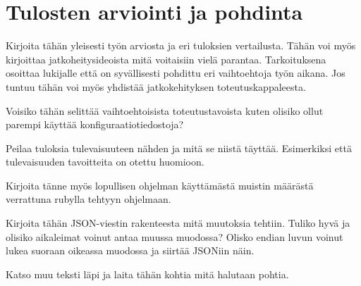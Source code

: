 \chapter{Tulosten arviointi ja pohdinta}
\begin{it}
Kirjoita tähän yleisesti työn arviosta ja eri tuloksien vertailusta. Tähän voi myös kirjoittaa jatkoheitysideoista mitä voitaisiin vielä parantaa. Tarkoituksena osoittaa lukijalle että on syvällisesti pohdittu eri vaihtoehtoja työn aikana. Jos tuntuu tähän voi myös yhdistää jatkokehityksen toteutuskappaleesta.

Voisiko tähän selittää vaihtoehtoisista toteutustavoista kuten olisiko ollut parempi käyttää konfiguraatiotiedostoja?

Peilaa tuloksia tulevaisuuteen nähden ja mitä se niistä täyttää. Esimerkiksi että tulevaisuuden tavoitteita on otettu huomioon.

Kirjoita tänne myös lopullisen ohjelman käyttämästä muistin määrästä verrattuna rubylla tehtyyn ohjelmaan.

Kirjoita tähän JSON-viestin rakenteesta mitä muutoksia tehtiin. Tuliko hyvä ja olisiko aikaleimat voinut antaa muussa muodossa? Olisko endian luvun voinut lukea suoraan oikeassa muodossa ja siirtää JSONiin näin.

Katso muu teksti läpi ja laita tähän kohtia mitä halutaan pohtia.
\end{it}
